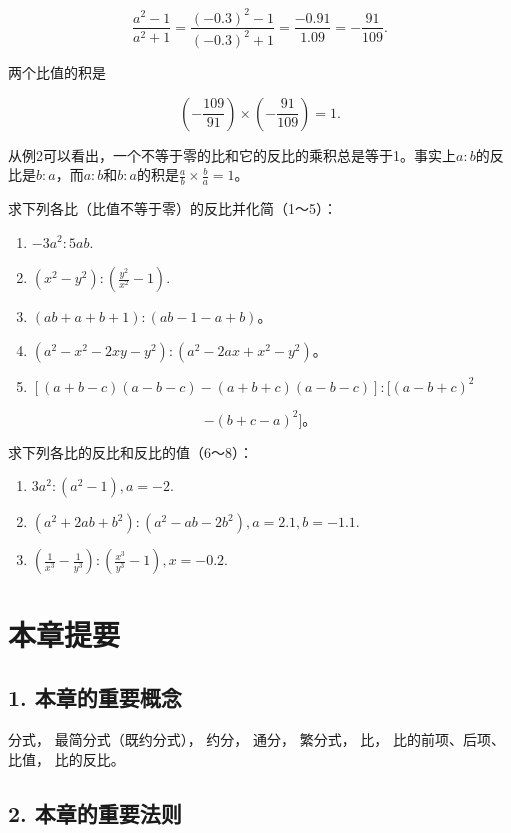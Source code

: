 \[
\frac{a ^{2} - 1}{a ^{2} + 1} = \frac{(- 0.3) ^{2} - 1}{(- 0.3) ^{2} + 1} = \frac{- 0.91}{1.09} = - \frac{91}{109}.
\]

两个比值的积是

\[
\left(- \frac{109}{91}\right) \times \left(- \frac{91}{109}\right) = 1.
\]

从例2可以看出，一个不等于零的比和它的反比的乘积总是等于1。事实上\(a:b\)的反比是\(b:a\)，而\(a:b\)和\(b:a\)的积是\(\frac{a}{b} \times \frac{b}{a} = 1\)。

求下列各比（比值不等于零）的反比并化简（1～5）：

\begin{enumerate}[start=1]
\item
  \(-3a^{2}:5ab.\)
\item
  \((x^{2} - y^{2}):\left(\frac{y^{2}}{x^{2}} -1\right).\)
\item
  \((ab + a + b + 1):(ab - 1 - a + b)\)。
\item
  \((a^2 - x^2 - 2xy - y^2): (a^2 - 2ax + x^2 - y^2)\)。
\item
  \(\left[(a + b - c)(a - b - c) - (a + b + c)(a - b - c)\right]:[(a - b + c)^2\)
\end{enumerate}

\[
- (b + c - a) ^{2} ]\text{。}
\]

求下列各比的反比和反比的值（6～8）：

\begin{enumerate}[start=6]
\item
  \(3a^{2}:(a^{2}-1), a=-2.\)
\item
  \((a^{2} + 2ab + b^{2}):(a^{2} - ab - 2b^{2}), a = 2.1, b = -1.1.\)
\item
  \(\left(\frac{1}{x^3} -\frac{1}{y^3}\right):\left(\frac{x^3}{y^3} -1\right),x = -0.2.\)
\end{enumerate}

\section{本章提要}

\subsection{1. 本章的重要概念}

分式， 最简分式（既约分式）， 约分， 通分， 繁分式， 比，
比的前项、后项、比值， 比的反比。

\subsection{2. 本章的重要法则}

